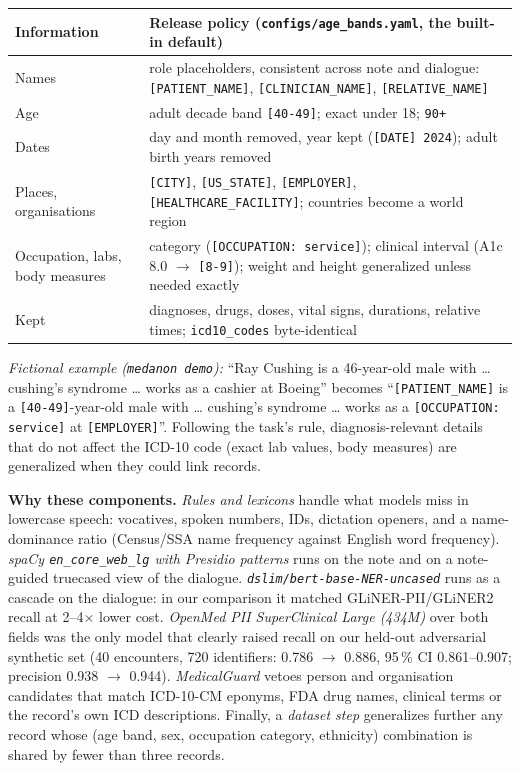 \documentclass[10pt,a4paper]{article}
\newcommand{\ra}{\ensuremath{\rightarrow}}
\newcommand{\ph}[1]{\texttt{\small[#1]}}
\newcommand{\code}[1]{\texttt{\small #1}}
\begin{document}
{\footnotesize
\begin{tabularx}{\textwidth}{@{}P{3.6cm}L@{}}
\toprule
\textbf{Information} & \textbf{Release policy} (\code{configs/age\_bands.yaml}, the built-in default)\\
\midrule
Names & role placeholders, consistent across note and dialogue: \ph{PATIENT\_NAME}, \ph{CLINICIAN\_NAME}, \ph{RELATIVE\_NAME}\\
Age & adult decade band \ph{40-49}; exact under 18; \code{90+}\\
Dates & day and month removed, year kept (\ph{DATE}~\code{2024}); adult birth years removed\\
Places, organisations & \ph{CITY}, \ph{US\_STATE}, \ph{EMPLOYER}, \ph{HEALTHCARE\_FACILITY}; countries become a world region\\
Occupation, labs, body measures & category (\ph{OCCUPATION: service}); clinical interval (A1c 8.0 \ra{} \ph{8-9}); weight and height generalized unless needed exactly\\
Kept & diagnoses, drugs, doses, vital signs, durations, relative times; \code{icd10\_codes} byte-identical\\
\bottomrule
\end{tabularx}}

\emph{Fictional example (\code{medanon demo}):} ``Ray Cushing is a 46-year-old male with \ldots{} cushing's syndrome
\ldots{} works as a cashier at Boeing'' becomes ``\ph{PATIENT\_NAME} is a \ph{40-49}-year-old male with \ldots{}
cushing's syndrome \ldots{} works as a \ph{OCCUPATION: service} at \ph{EMPLOYER}''. Following the task's rule, diagnosis-relevant details that do not affect the ICD-10
code (exact lab values, body measures) are generalized when they could link records.

\textbf{Why these components.} \emph{Rules and lexicons} handle what models miss in lowercase speech: vocatives,
spoken numbers, IDs, dictation openers, and a name-dominance ratio (Census/SSA name frequency against English word
frequency). \emph{spaCy \code{en\_core\_web\_lg} with Presidio patterns} runs on the note and on a note-guided
truecased view of the dialogue. \emph{\code{dslim/bert-base-NER-uncased}} runs as a cascade on the dialogue: in our
comparison it matched GLiNER-PII/GLiNER2 recall at 2--4$\times$ lower cost. \emph{OpenMed PII SuperClinical Large
(434M)} over both fields was the only model that clearly raised recall on our held-out adversarial synthetic set
(40 encounters, 720 identifiers: 0.786 \ra{} 0.886, 95\,\% CI 0.861--0.907; precision 0.938 \ra{} 0.944).
\emph{MedicalGuard} vetoes person and organisation candidates that match ICD-10-CM eponyms, FDA drug names, clinical
terms or the record's own ICD descriptions. Finally, a \emph{dataset step} generalizes further any record whose
(age band, sex, occupation category, ethnicity) combination is shared by fewer than three records.
\end{document}

